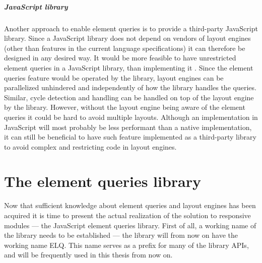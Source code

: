 \documentclass[a4paper,11pt]{kth-mag}
\begin{document}
      \paragraph{JavaScript library}
      Another approach to enable element queries is to provide a \gls{third-party} \gls{JavaScript} library.
      Since a \gls{JavaScript} library does not depend on vendors of \glspl{layout engine} (other than features in the current language specifications) it can therefore be designed in any desired way.
      It would be more feasible to have unrestricted element queries in a \gls{JavaScript} library, than implementing it .
      Since the element queries feature would be operated by the library, \glspl{layout engine} can be parallelized unhindered and independently of how the library handles the queries.
      Similar, cycle detection and handling can be handled on top of the \gls{layout engine} by the library.
      However, without the \gls{layout engine} being aware of the element queries it could be hard to avoid multiple layouts.
      Although an implementation in \gls{JavaScript} will most probably be less performant than a \gls{native} implementation, it can still be beneficial to have such feature implemented as a \gls{third-party} library to avoid complex and restricting code in \glspl{layout engine}.



  \chapter{The element queries library}\label{ch:library}
    Now that sufficient knowledge about element queries and \glspl{layout engine} has been acquired it is time to present the actual realization of the solution to \gls{responsive} modules --- the \gls{JavaScript} element queries library.
    First of all, a working name of the library needs to be established --- the library will from now on have the working name \gls{ELQ}.
    This name serves as a prefix for many of the library \glspl{API}, and will be frequently used in this thesis from now on.
    
\end{document}
